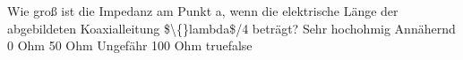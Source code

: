    {Wie groß ist die Impedanz am Punkt a, wenn die elektrische Länge der abgebildeten Koaxialleitung \$\textbackslash\{\}lambda\$/4 beträgt?}
    {Sehr hochohmig}
    {Annähernd 0 Ohm}
    {50 Ohm}
    {Ungefähr 100 Ohm}
    {true}{false}
